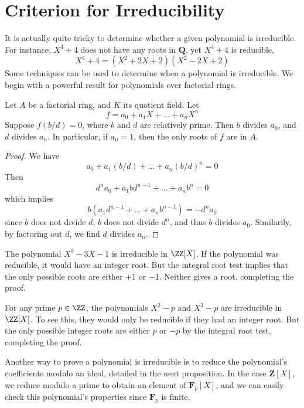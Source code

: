 \section{Criterion for Irreducibility}

It is actually quite tricky to determine whether a given polynomial is irreducible. For instance, $X^4 + 4$ does not have any roots in $\mathbf{Q}$, yet $X^4 + 4$ is reducible,
%
\[ X^4 + 4 = (X^2 + 2X + 2)(X^2 - 2X + 2) \]
%
Some techniques can be used to determine when a polynomial is irreducible. We begin with a powerful result for polynomials over factorial rings.

\begin{theorem}
    Let $A$ be a factorial ring, and $K$ its quotient field. Let
    \[ f = a_0 + a_1 X + \dots + a_n X^n \]
    Suppose $f(b/d) = 0$, where $b$ and $d$ are relatively prime. Then $b$ divides $a_0$, and $d$ divides $a_n$. In particular, if $a_n = 1$, then the only roots of $f$ are in $A$.
\end{theorem}
\begin{proof}
    We have
    \[ a_0 + a_1 (b/d) + \dots + a_n (b/d)^n = 0 \]
    Then
    \[ d^n a_0 + a_1 b d^{n-1} + \dots + a_n b^n = 0 \]
    which implies
    \[ b(a_1 d^{n-1} + \dots + a_n b^{n-1}) = -d^n a_0 \]
    since $b$ does not divide $d$, $b$ does not divide $d^n$, and thus $b$ divides $a_0$. Similarily, by factoring out $d$, we find $d$ divides $a_n$.
\end{proof}

\begin{example}
    The polynomial $X^3 - 3X - 1$ is irreducible in $\ZZ[X]$. If the polynomial was reducible, it would have an integer root. But the integral root test implies that the only possible roots are either $+1$ or $-1$. Neither gives a root, completing the proof.
\end{example}

\begin{example}
    For any prime $p \in \ZZ$, the polynomials $X^2 - p$ and $X^3 - p$ are irreducible in $\ZZ[X]$. To see this, they would only be reducible if they had an integer root. But the only possible integer roots are either $p$ or $-p$ by the integral root test, completing the proof.
\end{example}

Another way to prove a polynomial is irreducible is to reduce the polynomial's coefficients modulo an ideal, detailed in the next proposition. In the case $\mathbf{Z}[X]$, we reduce modulo a prime to obtain an element of $\mathbf{F}_p[X]$, and we can easily check this polynomial's properties since $\mathbf{F}_p$ is finite.

